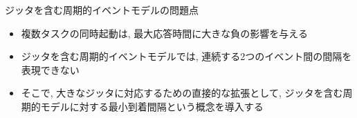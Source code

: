


\begin{frame}{ジッタを含む周期的イベントモデルの問題点}
    \begin{itemize}
        \item 複数タスクの同時起動は, 最大応答時間に大きな負の影響を与える
        \item ジッタを含む周期的イベントモデルでは, 連続する2つのイベント間の間隔を表現できない
        \item そこで, 大きなジッタに対応するための直接的な拡張として, ジッタを含む周期的モデルに対する最小到着間隔という概念を導入する
    \end{itemize}
\end{frame}

